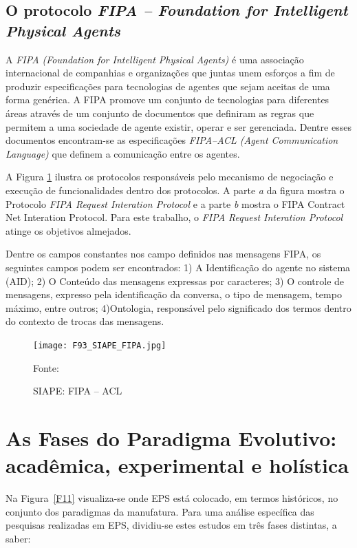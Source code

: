 \subsection{O protocolo \textit{FIPA -- Foundation for Intelligent Physical Agents}}	

A \textit{FIPA (Foundation for Intelligent Physical Agents)} é uma associação internacional de companhias e organizações que juntas unem esforços a fim de produzir especificações para tecnologias de agentes que sejam aceitas de uma forma genérica. A FIPA promove um conjunto de tecnologias para diferentes áreas através de um conjunto de documentos que  definiram as regras que permitem a uma sociedade de agente existir, operar e ser gerenciada.  Dentre esses documentos encontram-se as especificações \textit{FIPA--ACL (Agent Communication Language)} que definem a comunicação entre os agentes. 

A Figura \ref{F93} ilustra os protocolos responsáveis pelo mecanismo de negociação e execução de funcionalidades dentro dos protocolos. A parte \textit{a} da figura mostra o Protocolo \textit{FIPA Request Interation Protocol} e a parte \textit{b} mostra o FIPA Contract Net Interation Protocol. Para este trabalho, o \textit{FIPA Request Interation Protocol} atinge os objetivos almejados.

Dentre os campos constantes nos campo definidos nas mensagens FIPA, os seguintes campos podem ser encontrados: 1) A Identificação do agente no sistema (AID); 2) O Conteúdo das mensagens expressas por caracteres; 3) O controle de mensagens, expresso pela identificação da conversa, o tipo de mensagem, tempo máximo, entre outros; 4)Ontologia, responsável pelo significado dos termos dentro do contexto de trocas das mensagens.


\begin{figure}
	\centering
	\texttt{[image: F93\_SIAPE\_FIPA.jpg]}
	\caption{SIAPE: FIPA -- ACL}
	\footnotesize{Fonte:~\cite{FIPA2002b,FIPA2002c}}
	\label{F93}
\end{figure}		


\section{As Fases do Paradigma Evolutivo: acadêmica, experimental e holística}

Na Figura~\ref{F11} visualiza-se onde EPS está colocado, em termos históricos, no conjunto dos paradigmas da manufatura. Para uma análise específica das pesquisas realizadas em EPS, dividiu-se estes estudos em três fases distintas, a saber:



